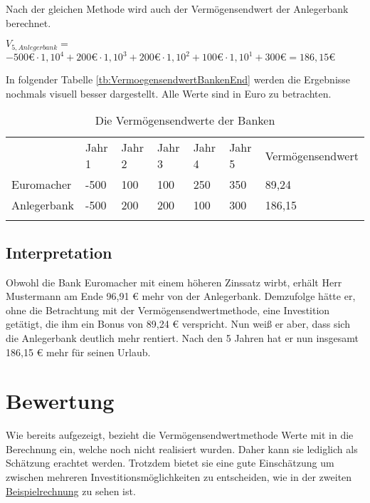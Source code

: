 \bigskip
\noindent
Nach der gleichen Methode wird auch der Vermögensendwert der Anlegerbank berechnet.

\bigskip
$V_{5, Anlegerbank} =$\\
\hspace*{10mm}$-500 \text{€} \cdot 1,10^4 + 200 \text{€} \cdot 1,10^3 + 200 \text{€} \cdot 1,10^2 + 100 \text{€} \cdot 1,10^1 + 300 \text{€} = 186,15 \text{€}$

\bigskip
\bigskip
\noindent
In folgender Tabelle \eqref{tb:VermoegensendwertBankenEnd} werden die Ergebnisse nochmals visuell besser dargestellt. Alle Werte sind in Euro zu betrachten.

\bigskip

\begin{table}[!h]
    \begin{tabular}{lllllll}
        \cline{1-6} \rowcolor{gray}
                    & Jahr 1 & Jahr 2 & Jahr 3 & Jahr 4 & Jahr 5 & Vermögensendwert \\ \cline{1-7} \rowcolor{white}
        Euromacher  & -500   & 100    & 100    & 250    & 350    & 89,24            \\ \cline{1-7} \rowcolor{white}
        Anlegerbank & -500   & 200    & 200    & 100    & 300    & 186,15           \\ \cline{1-7} \rowcolor{white}
    \end{tabular}
    \caption{Die Vermögensendwerte der Banken}
    \label{tb:VermoegensendwertBankenEnd}
\end{table}

\subsection{Interpretation}

Obwohl die Bank Euromacher mit einem höheren Zinssatz wirbt, erhält Herr Mustermann am Ende 96,91 € mehr von der Anlegerbank. Demzufolge hätte er, ohne die Betrachtung mit der Vermögensendwertmethode, eine Investition getätigt, die ihm ein Bonus von 89,24 € verspricht. Nun weiß er aber, dass sich die Anlegerbank deutlich mehr rentiert. Nach den 5 Jahren hat er nun insgesamt 186,15 € mehr für seinen Urlaub.

\section{Bewertung}

Wie bereits aufgezeigt, bezieht die Vermögensendwertmethode Werte mit in die Berechnung ein, welche noch nicht realisiert wurden. Daher kann sie lediglich als Schätzung erachtet werden. Trotzdem bietet sie eine gute Einschätzung um zwischen mehreren Investitionsmöglichkeiten zu entscheiden, wie in der zweiten \hyperref[beispielrechnungVer]{Beispielrechnung} zu sehen ist.
